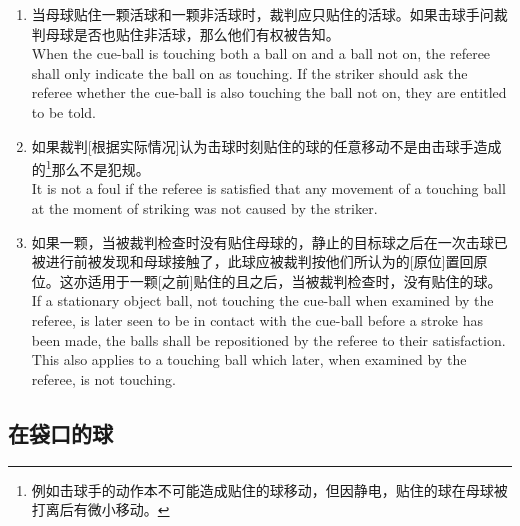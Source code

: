 \begin{enumerate}[label=(\alph*)]
    \item 当母球贴住一颗活球和一颗非活球时，裁判应只\indicate{}贴住的活球。如果击球手问裁判母球是否也贴住非活球，那么他们有权被告知。\\
    When the cue-ball is touching both a ball on and a ball not on, the referee shall only indicate the ball on as touching. If the striker should ask the referee whether the cue-ball is also touching the ball not on, they are entitled to be told.
    \item 如果裁判[根据实际情况]认为击球时刻贴住的球的任意移动不是由击球手造成的\footnote{例如击球手的动作本不可能造成贴住的球移动，但因静电，贴住的球在母球被打离后有微小移动。}那么不是犯规。\\
    It is not a foul if the referee is satisfied that any movement of a touching ball at the moment of striking was not caused by the striker.
    \item 如果一颗，当被裁判检查时没有贴住母球的，静止的目标球之后在一次击球已被进行前被发现和母球接触了，此球应被裁判按他们所认为的[原位]置回原位。这亦适用于一颗[之前]贴住的且之后，当被裁判检查时，没有贴住的球。\\
    If a stationary object ball, not touching the cue-ball when examined by the referee, is later seen to be in contact with the cue-ball before a stroke has been made, the balls shall be repositioned by the referee to their satisfaction. This also applies to a touching ball which later, when examined by the referee, is not touching.
\end{enumerate}

\subsection{在袋口的球}\label{2239}


